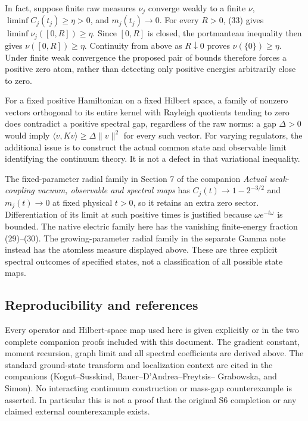 \documentclass[
  11pt,
]{article}
\begin{document}
In fact, suppose finite raw measures \(\nu_j\) converge weakly to a
finite \(\nu\), \(\liminf C_j(t_j)\ge\eta>0\), and \(m_j(t_j)\to0\). For
every \(R>0\), (33) gives \(\liminf\nu_j([0,R])\ge\eta\). Since
\([0,R]\) is closed, the portmanteau inequality then gives
\(\nu([0,R])\ge\eta\). Continuity from above as \(R\downarrow0\) proves
\(\nu(\{0\})\ge\eta\). Under finite weak convergence the proposed pair
of bounds therefore forces a positive zero atom, rather than detecting
only positive energies arbitrarily close to zero.

For a fixed positive Hamiltonian on a fixed Hilbert space, a family of
nonzero vectors orthogonal to its entire kernel with Rayleigh quotients
tending to zero does contradict a positive spectral gap, regardless of
the raw norms: a gap \(\Delta>0\) would imply
\(\langle v,Kv\rangle\ge\Delta\|v\|^2\) for every such vector. For
varying regulators, the additional issue is to construct the actual
common state and observable limit identifying the continuum theory. It
is not a defect in that variational inequality.

The fixed-parameter radial family in Section 7 of the companion
\emph{Actual weak-coupling vacuum, observable and spectral maps} has
\(C_j(t)\to1-2^{-3/2}\) and \(m_j(t)\to0\) at fixed physical \(t>0\), so
it retains an extra zero sector. Differentiation of its limit at such
positive times is justified because \(\omega e^{-t\omega}\) is bounded.
The native electric family here has the vanishing finite-energy fraction
(29)--(30). The growing-parameter radial family in the separate Gamma
note instead has the atomless measure displayed above. These are three
explicit spectral outcomes of specified states, not a classification of
all possible state maps.

\subsection{Reproducibility and
references}\label{weak-coupling-part-3-reproducibility-and-references}

Every operator and Hilbert-space map used here is given explicitly or in
the two complete companion proofs included with this document. The
gradient constant, moment recursion, graph limit and all spectral
coefficients are derived above. The standard ground-state transform and
localization context are cited in the companions (Kogut--Susskind,
Bauer--D'Andrea--Freytsis-- Grabowska, and Simon). No interacting
continuum construction or mass-gap counterexample is asserted. In
particular this is not a proof that the original S6 completion or any
claimed external counterexample exists.
\end{document}
